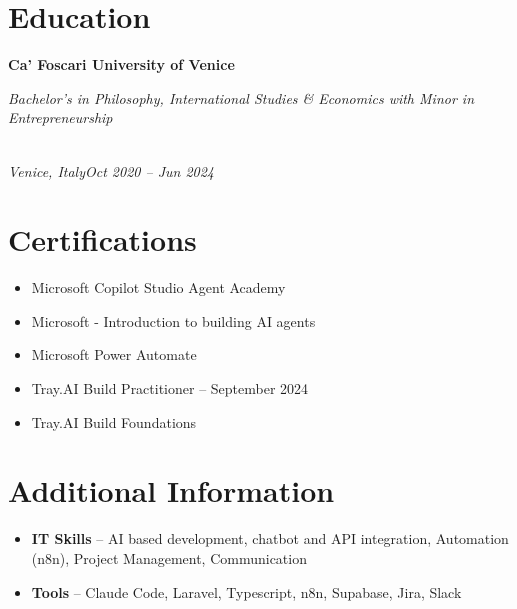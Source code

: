 \documentclass[a4paper,10pt]{article}
\newcommand{\role}[4]{\vspace{3pt}\noindent\hspace{0.6em}\parbox[t]{0.38\textwidth}{\raggedright\textbf{#1}}\hfill\parbox[t]{0.58\textwidth}{\raggedleft\textit{#2}}\\{\textit{#3}\hfill\textit{#4}}\vspace{1pt}}
\begin{document}
\section{Education}
\role{Ca' Foscari University of Venice}{Bachelor's in Philosophy, International Studies \& Economics with Minor in Entrepreneurship}{Venice, Italy}{Oct 2020 -- Jun 2024}

\section{Certifications}
\begin{itemize}
\item Microsoft Copilot Studio Agent Academy
\item Microsoft - Introduction to building AI agents
\item Microsoft Power Automate
\item Tray.AI Build Practitioner -- September 2024
\item Tray.AI Build Foundations
\end{itemize}

\section{Additional Information}
\begin{itemize}
\item \textbf{IT Skills} -- AI based development, chatbot and API integration, Automation (n8n), Project Management, Communication
\item \textbf{Tools} -- Claude Code, Laravel, Typescript, n8n, Supabase, Jira, Slack
\end{itemize}
\end{document}
